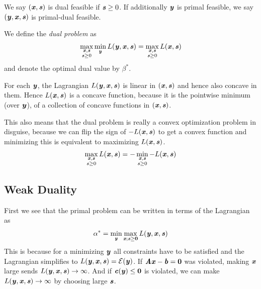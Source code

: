 \begin{definition}
We say $(\xx, \ss)$ is dual feasible if $\ss \geq 0$.
If additionally $\yy$ is primal feasible, we say $(\yy, \xx, \ss)$ is primal-dual feasible.
\end{definition}

\begin{definition}
We define the \emph{dual problem} as
\begin{align}
  \label{eq:dualprob}
  \max_{\substack{\xx, \ss \\ \ss \geq 0}}
  \min_{\yy}L(\yy, \xx, \ss)
  =
  \max_{\substack{\xx, \ss \\ \ss \geq 0}} L(\xx,  \ss)
  \end{align}
and denote the optimal dual value by $\beta^*$.
\end{definition}


For each $\yy$, the Lagrangian $L(\yy, \xx,
\ss)$ is linear in $(\xx,\ss)$ and hence also concave in them.
Hence $L(\xx,  \ss)$ is a concave function, because it is the pointwise
minimum (over $\yy$), of a collection of concave functions in
$(\xx,\ss)$.

This also means that the dual problem is really a convex optimization
problem in disguise, because we can flip the sign of $-L(\xx,  \ss)$
to get a convex function and minimizing this is equivalent to
maximizing $L(\xx,  \ss)$.
\begin{align*}
  \max_{\substack{\xx, \ss \\ \ss \geq 0}} L(\xx,  \ss)
  =
  -
  \min_{\substack{\xx, \ss \\ \ss \geq 0}} -L(\xx,  \ss)
\end{align*}




\subsection{Weak Duality}
\label{sec:weakdual}
First we see that the primal problem can be written in terms of the Lagrangian as
\begin{equation}
  \label{eq:primalminmax}
  \alpha^* = \min_{\yy}\max_{\xx; \ss\geq\veczero} L(\yy, \xx, \ss)
\end{equation}
This is because for a minimizing $\yy$ all constraints have to be satisfied and the Lagrangian simplifies to $L(\yy,\xx,\ss) = \energy(\yy)$.
If $\AA\xx - \bb = \veczero$ was violated, making $\xx$ large sends $L(\yy,\xx,\ss) \rightarrow \infty$.
And if $\cc(\yy) \leq \veczero$ is violated, we can make $L(\yy,\xx,\ss) \rightarrow \infty$ by choosing large $\ss$.

